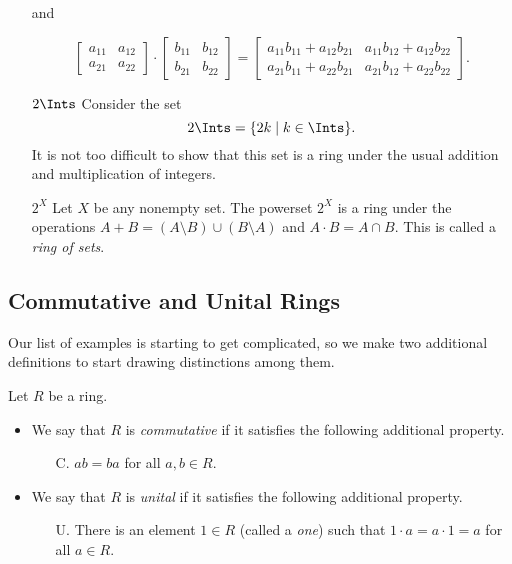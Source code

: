 \documentclass{article}
\begin{document}
\begin{itemize}
and

\[\begin{bmatrix} a_{11} & a_{12} \\ a_{21} & a_{22} \end{bmatrix} \cdot \begin{bmatrix} b_{11} & b_{12} \\ b_{21} & b_{22} \end{bmatrix} = \begin{bmatrix} a_{11}b_{11} + a_{12}b_{21} & a_{11}b_{12} + a_{12}b_{22} \\ a_{21}b_{11} + a_{22}b_{21} & a_{21}b_{12} + a_{22}b_{22} \end{bmatrix}.\]

\item[$2\Ints$] Consider the set \[ 2\Ints = \{ 2k \mid k \in \Ints \}. \] It is not too difficult to show that this set is a ring under the usual addition and multiplication of integers.

\item[$2^X$] Let $X$ be any nonempty set. The powerset $2^X$ is a ring under the operations $A + B = (A \setminus B) \cup (B \setminus A)$ and $A \cdot B = A \cap B$. This is called a \emph{ring of sets}.
\end{itemize}

\subsection*{Commutative and Unital Rings}

Our list of examples is starting to get complicated, so we make two additional definitions to start drawing distinctions among them.

\begin{dfn}
Let $R$ be a ring.
\begin{itemize}
\item We say that $R$ is \emph{commutative} if it satisfies the following additional property.
\begin{itemize}
\item[C.] $ab = ba$ for all $a,b \in R$.
\end{itemize}
\item We say that $R$ is \emph{unital} if it satisfies the following additional property.
\begin{itemize}
\item[U.] There is an element $1 \in R$ (called a \emph{one}) such that $1 \cdot a = a \cdot 1 = a$ for all $a \in R$.
\end{itemize}
\end{itemize}
\end{dfn}
\end{document}
